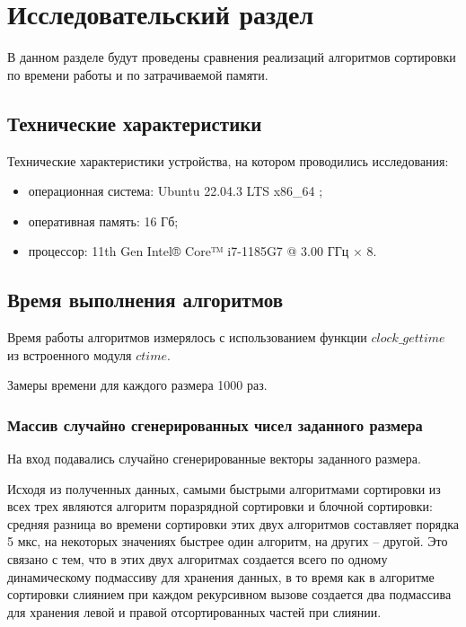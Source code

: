 \chapter{Исследовательский раздел}

В данном разделе будут проведены сравнения реализаций алгоритмов сортировки  по времени работы и по затрачиваемой памяти.

\section{Технические характеристики}

Технические характеристики устройства, на котором проводились исследования: 

\begin{itemize}[label=--]
	\item операционная система: Ubuntu 22.04.3 LTS x86\_64 \cite{os};
	\item оперативная память: 16 Гб;
	\item процессор: 11th Gen Intel® Core™ i7-1185G7 @ 3.00 ГГц × 8.
\end{itemize}

\section{Время выполнения алгоритмов}

Время работы алгоритмов измерялось с использованием функции $clock\_gettime$ из встроенного модуля $ctime$. 

Замеры времени для каждого размера 1000 раз.

\subsection{Массив случайно сгенерированных чисел заданного размера}

На вход подавались случайно сгенерированные векторы заданного размера.

Исходя из полученных данных, самыми быстрыми алгоритмами сортировки из всех трех являются алгоритм поразрядной сортировки и блочной сортировки: средняя разница во времени сортировки этих двух алгоритмов составляет порядка 5 мкс, на некоторых значениях быстрее один алгоритм, на других -- другой. Это связано с тем, что в этих двух алгоритмах создается всего по одному динамическому подмассиву для хранения данных, в то время как в алгоритме сортировки слиянием при каждом рекурсивном вызове создается два подмассива для хранения левой и правой отсортированных частей при слиянии. 

